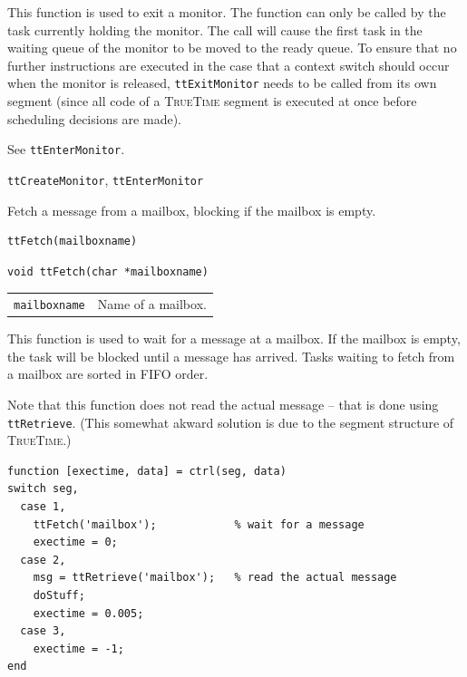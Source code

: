 \documentclass[final,twoside]{rapport}
\begin{document}
\descr This function is used to exit a monitor. The function can only
be called by the task currently holding the monitor. The call will
cause the first task in the waiting queue of the monitor to be moved
to the ready queue. To ensure that no further instructions are
executed in the case that a context switch should occur when the
monitor is released, \texttt{ttExitMonitor} needs to
be called from its own segment (since all code of a \textsc{TrueTime}
segment is executed at once before scheduling decisions are made). 

\example See \texttt{ttEnterMonitor}.

\seealso
{\tt ttCreateMonitor}, {\tt ttEnterMonitor}



\purpose
Fetch a message from a mailbox, blocking if the mailbox is empty.

\Msyntax
\begin{verbatim}
ttFetch(mailboxname) 
\end{verbatim}

\Csyntax
\begin{verbatim}
void ttFetch(char *mailboxname) 
\end{verbatim}

\args
\begin{tabularx}{\hsize}{l>{\raggedright\arraybackslash}X}
  {\tt mailboxname} & Name of a mailbox.
\end{tabularx}

\descr This function is used to wait for a message at a mailbox. If
the mailbox is empty, the task will be blocked until a message has
arrived. Tasks waiting to fetch from a mailbox are sorted in FIFO order. 

Note that this function does not read the actual message -- that is
done using {\tt ttRetrieve}. (This somewhat akward solution is due to
the segment structure of \textsc{TrueTime}.) 

\example 
\begin{small}
\begin{verbatim}
function [exectime, data] = ctrl(seg, data)
switch seg,
  case 1, 
    ttFetch('mailbox');            % wait for a message
    exectime = 0;
  case 2,
    msg = ttRetrieve('mailbox');   % read the actual message
    doStuff;
    exectime = 0.005;
  case 3,
    exectime = -1;
end
\end{verbatim}
\end{small}
\end{document}
